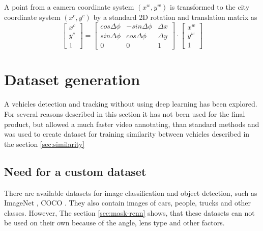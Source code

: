 \documentclass[a4paper,12pt,titlepage, twoside]{article}
\numberwithin{figure}{section}
\begin{document}
A point from a camera coordinate system $(x^w, y^w)$ is transformed to the city coordinate system $(x^c, y^c)$ by a standard 2D rotation and translation matrix as
\[
  \begin{bmatrix}
    x^c \\
    y^c \\
    1
  \end{bmatrix}
   = 
  \begin{bmatrix}
    cos\Delta\phi & -sin\Delta\phi & \Delta x\\
    sin\Delta\phi & cos\Delta\phi & \Delta y\\
    0 & 0 & 1
  \end{bmatrix}   
  \cdot 
  \begin{bmatrix}
    x^w \\
    y^w \\
    1
  \end{bmatrix}
\]







\clearpage
\section{Dataset generation}
\label{sec:classical}

A vehicles detection and tracking without using deep learning has been explored. For several reasons described in this section it has not been used for the final product, but allowed a much faster video annotating, than standard methods and was used to create dataset for training similarity between vehicles described in the section \ref{sec:similarity}

\subsection{Need for a custom dataset}

There are available datasets for image classification and object detection, such as ImageNet \cite{krizhevsky2012imagenet}, COCO \cite{lin2014microsoft}. They also contain images of cars, people, trucks and other classes. However, The section \ref{sec:mask-rcnn} shows, that these datasets can not be used on their own because of the angle, lens type and other factors.
\end{document}
